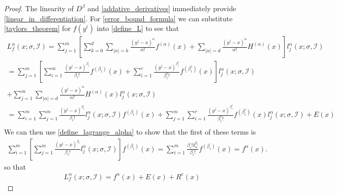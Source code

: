 \documentclass{article}
\theoremstyle{case}
\newcommand{\bidx}{{\mathcal I}}
\begin{document}
\begin{proof}
The linearity of $D^{\beta}$ and \cref{addative_derivatives} immediately provide \cref{linear_in_differentiation}.
For \cref{error_bound_formula} we can substitute \cref{taylors_theorem} for $f(y^i)$ into \cref{define_L} to see that
\begin{align*}
L_f^{\alpha}(x; \sigma, \bidx) = \sum_{j=1}^m \left[
\sum_{k=0}^{d} \sum_{|\alpha| = k} \frac{\left(y^j - x\right)^{\alpha}}{\alpha!}f^{(\alpha)}(x) + \sum_{|\alpha|=d}\frac{\left(y^j - x\right)^{\alpha}}{\alpha!} H^{(\alpha)}(x)
\right] l_j^{\alpha}(x; \sigma, \bidx) \\
= \sum_{j=1}^m \left[
\sum_{i=1}^m \frac{\left(y^j - x\right)^{\beta_i}}{\beta_i!}f^{(\beta_i)}(x) +
\sum_{i=1}^r \frac{\left(y^j - x\right)^{\beta^e_i}}{\beta^e_i!}f^{(\beta^e_i)}(x)
\right] l_j^{\alpha}(x; \sigma, \bidx)  \\
+ \sum_{j=1}^m \sum_{|\alpha|=d}\frac{\left(y^j - x\right)^{\alpha}}{\alpha!} H^{(\alpha)}(x)l_j^{\alpha}(x; \sigma, \bidx)  \\
=
\sum_{i=1}^m \sum_{j=1}^m\frac{\left(y^j - x\right)^{\beta_i}}{\beta_i!}l_j^{\alpha}(x; \sigma, \bidx)f^{(\beta_i)}(x) +
\sum_{j=1}^m\sum_{i=1}^r \frac{\left(y^j - x\right)^{\beta^e_i}}{\beta^e_i!}f^{(\beta^e_i)}(x)l_j^{\alpha}(x; \sigma, \bidx)
+ E(x)  \\
\end{align*}
We can then use \cref{define_lagrange_alpha} to show that the first of these terms is
\begin{align*}
\sum_{i=1}^m \left[\sum_{j=1}^m \frac{\left(y^j - x\right)^{\beta_i}}{\beta_i!}l_j^{\alpha}(x; \sigma, \bidx) \right]f^{(\beta_i)}(x)
= \sum_{i=1}^m \frac{\beta_i! \delta_{\alpha}^{\beta_i}}{\beta_i!}f^{(\beta_i)}(x)
= f^{\alpha}(x).
\end{align*}
so that
\begin{align*}
L_f^{\alpha}(x; \sigma, \bidx) = f^{\alpha}(x) + E(x) + R^e(x)
\end{align*}




% 
\end{proof}
\end{document}
